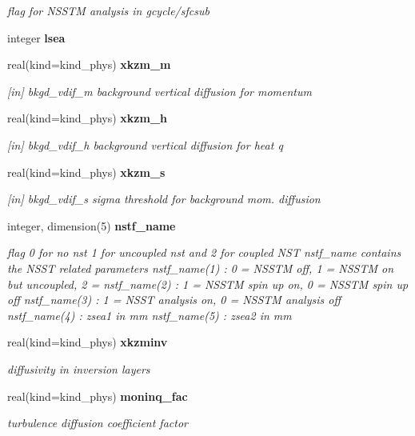 \begin{DoxyCompactItemize}
\begin{DoxyCompactList}\small\item\em flag for N\+S\+S\+TM analysis in gcycle/sfcsub \end{DoxyCompactList}\item 
integer \textbf{ lsea}
\item 
real(kind=kind\+\_\+phys) \textbf{ xkzm\+\_\+m}
\begin{DoxyCompactList}\small\item\em [in] bkgd\+\_\+vdif\+\_\+m background vertical diffusion for momentum \end{DoxyCompactList}\item 
real(kind=kind\+\_\+phys) \textbf{ xkzm\+\_\+h}
\begin{DoxyCompactList}\small\item\em [in] bkgd\+\_\+vdif\+\_\+h background vertical diffusion for heat q \end{DoxyCompactList}\item 
real(kind=kind\+\_\+phys) \textbf{ xkzm\+\_\+s}
\begin{DoxyCompactList}\small\item\em [in] bkgd\+\_\+vdif\+\_\+s sigma threshold for background mom. diffusion \end{DoxyCompactList}\item 
integer, dimension(5) \textbf{ nstf\+\_\+name}
\begin{DoxyCompactList}\small\item\em flag 0 for no nst 1 for uncoupled nst and 2 for coupled N\+ST nstf\+\_\+name contains the N\+S\+ST related parameters nstf\+\_\+name(1) \+: 0 = N\+S\+S\+TM off, 1 = N\+S\+S\+TM on but uncoupled, 2 = nstf\+\_\+name(2) \+: 1 = N\+S\+S\+TM spin up on, 0 = N\+S\+S\+TM spin up off nstf\+\_\+name(3) \+: 1 = N\+S\+ST analysis on, 0 = N\+S\+S\+TM analysis off nstf\+\_\+name(4) \+: zsea1 in mm nstf\+\_\+name(5) \+: zsea2 in mm \end{DoxyCompactList}\item 
real(kind=kind\+\_\+phys) \textbf{ xkzminv}
\begin{DoxyCompactList}\small\item\em diffusivity in inversion layers \end{DoxyCompactList}\item 
real(kind=kind\+\_\+phys) \textbf{ moninq\+\_\+fac}
\begin{DoxyCompactList}\small\item\em turbulence diffusion coefficient factor \end{DoxyCompactList}\item 

\end{DoxyCompactItemize}
